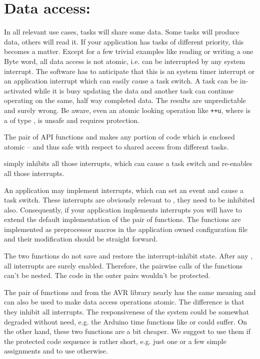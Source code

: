 \section{Data access: }
\label{secEnterLeaveCritSec}

In all relevant use cases, tasks will share some data. Some tasks will
produce data, others will read it. If your application has tasks of
different priority, this becomes a matter. Except for a few trivial
examples like reading or writing a one Byte word, all data access is not
atomic, i.e. can be interrupted by any system interrupt. The software has
to anticipate that this is an \rtos{} system timer interrupt or an
application interrupt which can easily cause a task switch. A task can be
in-activated while it is busy updating the data and another task can
continue operating on the same, half way completed data. The results are
unpredictable and surely wrong. Be aware, even an atomic looking operation
like \verb$++u$, where  is a of type , is unsafe
and requires protection.

The pair of API functions  and
 makes any portion of code which is
enclosed atomic -- and thus safe with respect to shared access from
different tasks.

 simply inhibits all those interrupts,
which can cause a task switch and 
re-enables all those interrupts.

An application may implement interrupts, which can set an \rtos{} event
and cause a task switch. These interrupts are obviously relevant to
, they need to be inhibited also.
Consequently, if your application implements interrupts you will have to
extend the default implementation of the pair of functions. The functions
are implemented as preprocessor macros in the application owned \rtos{}
configuration file  and their modification should be
straight forward.

The two functions do not save and restore the interrupt-inhibit state.
After any , all interrupts are
surely enabled. Therefore, the pairwise calls of the functions can't be
nested. The code in the outer pairs wouldn't be protected.

The pair of functions  and  from the AVR library
nearly has the same meaning and can also be used to make data access
operations atomic. The difference is that they inhibit all interrupts. The
responsiveness of the system could be somewhat degraded without need, e.g.
the Arduino time functions like  or  could
suffer. On the other hand, these two functions are a bit cheaper. We
suggest to use them if the protected code sequence is rather short, e.g.
just one or a few simple assignments and to use
 otherwise.

